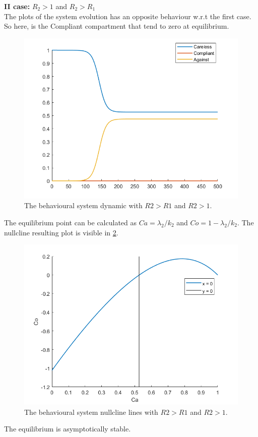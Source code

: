 \textbf{II case:} $R_2 >1$ and $R_2> R_1$\\
The plots of the system evolution has an opposite behaviour w.r.t the first case. So here, is the Compliant compartment that tend to zero at equilibrium. 

\begin{figure}[h]
	\centering
	\includegraphics[width=0.7\linewidth]{figure/behavioural_equilibrium/r2greater1_dyn}
	\caption[Behavioural dynamic second case]{The behavioural system dynamic with $R2 > R1$ and $R2 > 1$.}
	\label{fig:r2greater1dyn}
\end{figure}
The equilibrium point can be calculated as $Ca = \lambda_2/k_2$ and $Co = 1 - \lambda_2/k_2$. 
The nullcline resulting plot is visible in \ref{fig:r2greater1nullcline}. 
\begin{figure}[h]
	\centering
	\includegraphics[width=0.7\linewidth]{figure/behavioural_equilibrium/r2greater1_nullcline_1}
	\caption[Behavioural nullcline second case]{The behavioural system nullcline lines with $R2 > R1$ and $R2 > 1$.}
	\label{fig:r2greater1nullcline}
\end{figure}
The equilibrium is asymptotically stable. 

